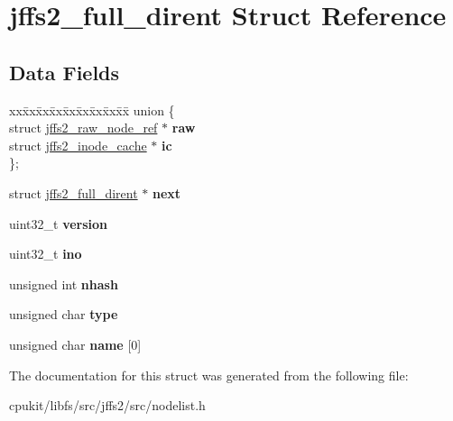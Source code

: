 \hypertarget{structjffs2__full__dirent}{}\section{jffs2\+\_\+full\+\_\+dirent Struct Reference}
\label{structjffs2__full__dirent}
\subsection*{Data Fields}
\begin{DoxyCompactItemize}
\item 
\mbox{\label{structjffs2__full__dirent_a1269f33e3de99fed2a5aaaa7ce04171e}} 
\begin{tabbing}
xx\=xx\=xx\=xx\=xx\=xx\=xx\=xx\=xx\=\kill
union \{\\
\>struct \mbox{\hyperlink{structjffs2__raw__node__ref}{jffs2\_raw\_node\_ref}} $\ast$ {\bfseries raw}\\
\>struct \mbox{\hyperlink{structjffs2__inode__cache}{jffs2\_inode\_cache}} $\ast$ {\bfseries ic}\\
\}; \\

\end{tabbing}\item 
\mbox{\label{structjffs2__full__dirent_a3688f70107a665ca7e0f6787b82f2ae6}} 
struct \mbox{\hyperlink{structjffs2__full__dirent}{jffs2\+\_\+full\+\_\+dirent}} $\ast$ {\bfseries next}
\item 
\mbox{\label{structjffs2__full__dirent_a1790119bcc17c7c6cd72738baac59d30}} 
uint32\+\_\+t {\bfseries version}
\item 
\mbox{\label{structjffs2__full__dirent_a82a714a4092a03200116b9d6f4c37107}} 
uint32\+\_\+t {\bfseries ino}
\item 
\mbox{\label{structjffs2__full__dirent_ae878125b223d6b1a37cf0c28803a5531}} 
unsigned int {\bfseries nhash}
\item 
\mbox{\label{structjffs2__full__dirent_a709ce2bcef5a23c5b423964224f2799b}} 
unsigned char {\bfseries type}
\item 
\mbox{\label{structjffs2__full__dirent_acd8115a7be5271d10a8a65ac43a3d7eb}} 
unsigned char {\bfseries name} \mbox{[}0\mbox{]}
\end{DoxyCompactItemize}


The documentation for this struct was generated from the following file\+:\begin{DoxyCompactItemize}
\item 
cpukit/libfs/src/jffs2/src/nodelist.\+h\end{DoxyCompactItemize}
